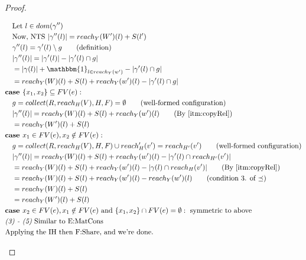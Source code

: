 \documentclass{easychair}
\theoremstyle{definition}
\begin{document}
\begin{proof}
\begin{description}
\begin{align*}
		&\quad \text{Let } l \in dom(\gamma'')\\
		&\quad \text{Now, NTS } |\gamma''(l)| = reach_{Y}(W')(l) + S(l')\\
		&\quad \gamma''(l) = \gamma'(l) \setminus g \tag{definition}\\ 
		&\quad |\gamma''(l)| = |\gamma'(l)| - |\gamma'(l) \cap g|\\
		&\quad = |\gamma(l)| + \mathbbm{1}_{l \in reach_Y(w')} - |\gamma'(l) \cap g|\\
		&\quad = reach_Y(W)(l) + S(l) + reach_Y(w')(l) - |\gamma'(l) \cap g|\\
		&\textbf{case } \{x_1,x_2\} \subseteq FV(e):\\
		&\quad g = collect(R,reach_H(V),H,F) = \emptyset \tag{well-formed configuration}\\
		&\quad |\gamma''(l)| = reach_Y(W)(l) + S(l) + reach_Y(w')(l) \tag{By \ref{itm:copyRel}}\\
		&\quad = reach_Y(W')(l) + S(l) \\
		&\textbf{case } x_1 \in FV(e), x_2 \notin FV(e):\\
		&\quad g = collect(R,reach_H(V),H,F) \cup reach_H'(v') = reach_{H'}(v') 
			\tag{well-formed configuration}\\
		&\quad |\gamma''(l)| = reach_Y(W)(l) + S(l) + reach_Y(w')(l)
			- |\gamma'(l) \cap reach_{H'}(v')|\\
		&\quad = reach_Y(W)(l) + S(l) + reach_Y(w')(l) - |\gamma(l) \cap reach_H(v')|
			\tag{By \ref{itm:copyRel}}\\
		&\quad = reach_Y(W)(l) + S(l) + reach_Y(w')(l) - reach_Y(w')(l) 
			\tag{condition 3. of $\preceq$}\\
		&\quad = reach_Y(W)(l) + S(l)\\
		&\quad = reach_Y(W')(l) + S(l)\\
		&\textbf{case } x_2 \in FV(e), x_1 \notin FV(e) 
			\text{ and } \{x_1,x_2\} \cap FV(e) = \emptyset: \text{ symmetric to above}\\
		&\emph{(3) - (5)} \text{ Similar to E:MatCons}\\ 
		&\text{Applying the IH then F:Share, and we're done. }
	\end{align*}
  \end{description}
\end{proof}



\end{document}
